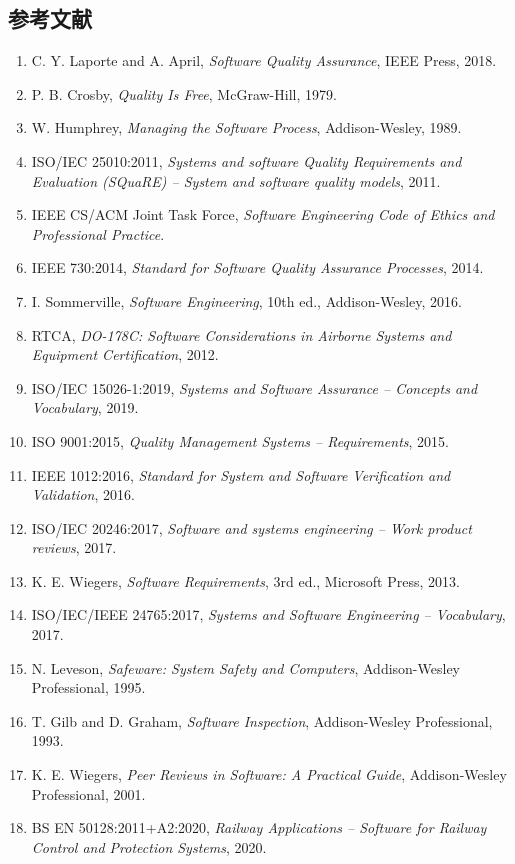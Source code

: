 \documentclass[a4paper,11pt]{ltjsarticle}
\numberwithin{figure}{section}
\numberwithin{table}{section}
\begin{document}
\subsection{参考文献}
\begin{enumerate}
  \item C. Y. Laporte and A. April, \textit{Software Quality Assurance}, IEEE Press, 2018.
  \item P. B. Crosby, \textit{Quality Is Free}, McGraw-Hill, 1979.
  \item W. Humphrey, \textit{Managing the Software Process}, Addison-Wesley, 1989.
  \item ISO/IEC 25010:2011, \textit{Systems and software Quality Requirements and Evaluation (SQuaRE) -- System and software quality models}, 2011.
  \item IEEE CS/ACM Joint Task Force, \textit{Software Engineering Code of Ethics and Professional Practice}.
  \item IEEE 730:2014, \textit{Standard for Software Quality Assurance Processes}, 2014.
  \item I. Sommerville, \textit{Software Engineering}, 10th ed., Addison-Wesley, 2016.
  \item RTCA, \textit{DO-178C: Software Considerations in Airborne Systems and Equipment Certification}, 2012.
  \item ISO/IEC 15026-1:2019, \textit{Systems and Software Assurance -- Concepts and Vocabulary}, 2019.
  \item ISO 9001:2015, \textit{Quality Management Systems -- Requirements}, 2015.
  \item IEEE 1012:2016, \textit{Standard for System and Software Verification and Validation}, 2016.
  \item ISO/IEC 20246:2017, \textit{Software and systems engineering -- Work product reviews}, 2017.
  \item K. E. Wiegers, \textit{Software Requirements}, 3rd ed., Microsoft Press, 2013.
  \item ISO/IEC/IEEE 24765:2017, \textit{Systems and Software Engineering -- Vocabulary}, 2017.
  \item N. Leveson, \textit{Safeware: System Safety and Computers}, Addison-Wesley Professional, 1995.
  \item T. Gilb and D. Graham, \textit{Software Inspection}, Addison-Wesley Professional, 1993.
  \item K. E. Wiegers, \textit{Peer Reviews in Software: A Practical Guide}, Addison-Wesley Professional, 2001.
  \item BS EN 50128:2011+A2:2020, \textit{Railway Applications -- Software for Railway Control and Protection Systems}, 2020.

\end{enumerate}
\end{document}
